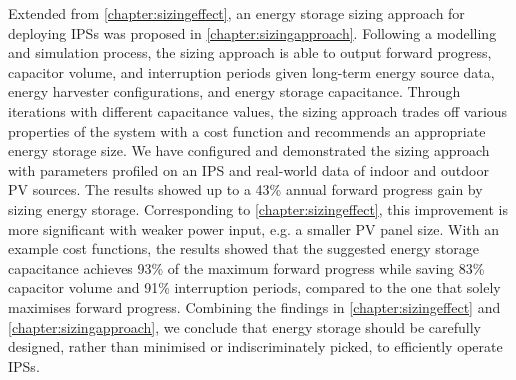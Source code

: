 Extended from \cref{chapter:sizingeffect}, an energy storage sizing approach for deploying IPSs was proposed in \cref{chapter:sizingapproach}.
Following a modelling and simulation process, the sizing approach is able to output forward progress, capacitor volume, and interruption periods given long-term energy source data, energy harvester configurations, and energy storage capacitance.
Through iterations with different capacitance values, the sizing approach trades off various properties of the system with a cost function and recommends an appropriate energy storage size. 
We have configured and demonstrated the sizing approach with parameters profiled on an IPS and real-world data of indoor and outdoor PV sources. 
The results showed up to a 43\% annual forward progress gain by sizing energy storage.
Corresponding to \cref{chapter:sizingeffect}, this improvement is more significant with weaker power input, e.g. a smaller PV panel size. 
With an example cost functions, the results showed that the suggested energy storage capacitance achieves 93\% of the maximum forward progress while saving 83\% capacitor volume and 91\% interruption periods, compared to the one that solely maximises forward progress.
Combining the findings in \cref{chapter:sizingeffect} and \cref{chapter:sizingapproach}, we conclude that energy storage should be carefully designed, rather than minimised or indiscriminately picked, to efficiently operate IPSs. 

